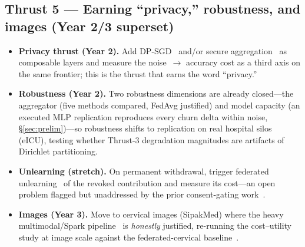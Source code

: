 \documentclass[11pt]{article}
\begin{document}
\subsection{Thrust 5 --- Earning ``privacy,'' robustness, and images (Year 2/3 superset)}
\begin{itemize}
\item \textbf{Privacy thrust (Year 2).} Add DP-SGD~\cite{dpsgd} and/or secure
aggregation~\cite{secagg} as composable layers and measure the noise~$\rightarrow$
accuracy cost as a third axis on the same frontier; this is the thrust that earns
the word ``privacy.''
\item \textbf{Robustness (Year 2).} Two robustness dimensions are already
closed---the aggregator (five methods compared, FedAvg justified) and model
capacity (an executed MLP replication reproduces every churn delta within
noise, \S\ref{sec:prelim})---so robustness shifts to replication on real
hospital silos (eICU), testing whether Thrust-3 degradation magnitudes are
artifacts of Dirichlet partitioning.
\item \textbf{Unlearning (stretch).} On permanent withdrawal, trigger federated
unlearning~\cite{unlearning} of the revoked contribution and measure its
cost---an open problem flagged but unaddressed by the prior consent-gating
work~\cite{oxford2025}.
\item \textbf{Images (Year 3).} Move to cervical images (SipakMed) where the heavy
multimodal/Spark pipeline~\cite{cervical} is \emph{honestly} justified, re-running
the cost--utility study at image scale against the federated-cervical
baseline~\cite{joynab2024}.
\end{itemize}
\end{document}
